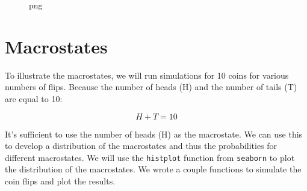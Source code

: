 \begin{figure}
\centering
{}
\caption{png}
\end{figure}

\section{Macrostates}\label{macrostates}

To illustrate the macrostates, we will run simulations for 10 coins for
various numbers of flips. Because the number of heads (H) and the number
of tails (T) are equal to 10:

\[H+T = 10\]

It's sufficient to use the number of heads (H) as the macrostate. We can
use this to develop a distribution of the macrostates and thus the
probabilities for different macrostates. We will use the
\texttt{histplot} function from \texttt{seaborn} to plot the
distribution of the macrostates. We wrote a couple functions to simulate
the coin flips and plot the results.

